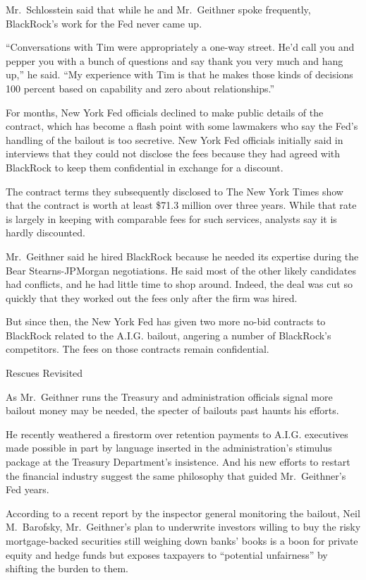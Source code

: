 \documentclass[12pt,a4paper,onecolumn]{article}
\begin{document}
Mr.~Schlosstein said that while he and Mr.~Geithner spoke frequently, BlackRock's work for the Fed
never came up.

``Conversations with Tim were appropriately a one-way street. He'd call you and pepper you with a
bunch of questions and say thank you very much and hang up,'' he said. ``My experience with Tim is
that he makes those kinds of decisions 100 percent based on capability and zero about
relationships.''

For months, New York Fed officials declined to make public details of the contract, which has become
a flash point with some lawmakers who say the Fed's handling of the bailout is too secretive. New
York Fed officials initially said in interviews that they could not disclose the fees because they
had agreed with BlackRock to keep them confidential in exchange for a discount.

The contract terms they subsequently disclosed to The New York Times show that the contract is worth
at least \$71.3 million over three years. While that rate is largely in keeping with comparable fees
for such services, analysts say it is hardly discounted.

Mr.~Geithner said he hired BlackRock because he needed its expertise during the Bear
Stearns-JPMorgan negotiations. He said most of the other likely candidates had conflicts, and he had
little time to shop around. Indeed, the deal was cut so quickly that they worked out the fees only
after the firm was hired.

But since then, the New York Fed has given two more no-bid contracts to BlackRock related to the
A.I.G. bailout, angering a number of BlackRock's competitors. The fees on those contracts remain
confidential.

Rescues Revisited

As Mr.~Geithner runs the Treasury and administration officials signal more bailout money may be
needed, the specter of bailouts past haunts his efforts.

He recently weathered a firestorm over retention payments to A.I.G. executives made possible in part
by language inserted in the administration's stimulus package at the Treasury Department's
insistence. And his new efforts to restart the financial industry suggest the same philosophy that
guided Mr.~Geithner's Fed years.

According to a recent report by the inspector general monitoring the bailout, Neil M.~Barofsky,
Mr.~Geithner's plan to underwrite investors willing to buy the risky mortgage-backed securities
still weighing down banks' books is a boon for private equity and hedge funds but exposes taxpayers
to ``potential unfairness'' by shifting the burden to them.
\end{document}
